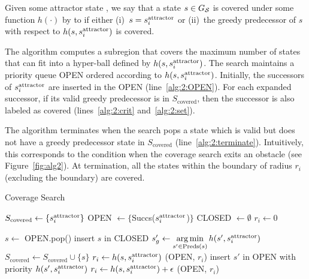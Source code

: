 \documentclass[a4paper]{report}
\begin{document}
\vspace{2mm}
\begin{definition}
  Given some attractor state \sAttract, we say that a state $s \in G_\mathcal{S}$ is covered under some function $h(\cdot)$ by to \sAttract if either
  (i)~$s = s^{\text{attractor}}_i$ or
  (ii)~the greedy predecessor of $s$ with respect to $h(s,s^{\text{attractor}}_i)$ is covered.
\end{definition}

The algorithm computes a subregion that covers the maximum number of states that can fit into a hyper-ball defined by $h(s,s^{\text{attractor}}_i)$. 
The search maintains a priority queue OPEN ordered according to $h(s,s^{\text{attractor}}_i)$. Initially, the successors of $s^{\text{attractor}}_i$ are inserted in the OPEN (line~\ref{alg:2:OPEN}). For each expanded successor, if its valid greedy predecessor is in $S_{\text{covered}}$, then the successor is also labeled as covered (lines~\ref{alg:2:crit} and~\ref{alg:2:set}). 

The algorithm terminates when the search pops a state which is valid but does not have a greedy predecessor state in $S_{\text{covered}}$ (line~\ref{alg:2:terminate}). Intuitively, this corresponds to the condition when the coverage search exits an obstacle (see Figure~\ref{fig:alg2}).
At termination, all the states within the boundary of radius $r_i$ (excluding the boundary) are covered.


\begin{algorithm}[t]
\caption{Coverage Search}\label{alg:2}

\begin{algorithmic}[1]
\State $S_{\text{covered}} \leftarrow \{s^{\text{attractor}}_i\}$  \label{alg:2:covered}
\State OPEN $\leftarrow \{$Succs($s^{\text{attractor}}_i$)$\}$   \label{alg:2:OPEN}
\State CLOSED $\leftarrow \emptyset$
\State $r_i \leftarrow 0$

    \State $s \leftarrow$ OPEN.pop()
    \State insert $s$ in CLOSED
    \State $s'_g \leftarrow \operatorname*{arg\,min}\limits_{s' \in \text{Preds}(s)} h(s', s^{\text{attractor}}_i)$ 
  \label{alg:2:greedy} 
      \label{alg:2:crit}
        \State $S_{\text{covered}} \leftarrow S_{\text{covered}} \cup \{s\}$   \label{alg:2:set}
     \label{alg:2:terminate}
        \State $r_i \leftarrow h(s, s^{\text{attractor}}_i)$ \label{alg:2:rad}
        \State \Return (OPEN, $r_i$)
    \EndIf
     \label{alg:2:prun}
            \State insert $s'$ in OPEN with priority $h(s', s^{\text{attractor}}_i)$
        \EndIf
    \EndFor
\EndWhile
\State $r_i \leftarrow h(s, s^{\text{attractor}}_i) + \epsilon$    
\State \Return (OPEN, $r_i$)

\EndProcedure
\end{algorithmic}
\end{algorithm}
\end{document}
